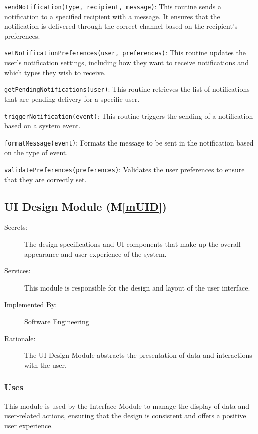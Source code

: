 \documentclass[12pt, titlepage]{article}
\newcommand{\mref}[1]{M\ref{#1}}
\begin{document}
\begin{description}
\begin{description}
  \item[Access Routine Semantics:]
  \item \texttt{sendNotification(type, recipient, message)}: This routine sends a notification to a 
  specified recipient with a message. It ensures that the notification is delivered through the correct 
  channel based on the recipient's preferences.
  \item \texttt{setNotificationPreferences(user, preferences)}: This routine updates the user's notification 
  settings, including how they want to receive notifications and which types they wish to receive.
  \item \texttt{getPendingNotifications(user)}: This routine retrieves the list of notifications that are 
  pending delivery for a specific user.
  \item \texttt{triggerNotification(event)}: This routine triggers the sending of a notification based on 
  a system event.
  \item 

  \item[Local Function:] 
  \item \texttt{formatMessage(event)}: Formats the message to be sent in the notification based on the 
  type of event.
  \item \texttt{validatePreferences(preferences)}: Validates the user preferences to ensure that they are 
  correctly set.
\end{description}

\subsection{UI Design Module (\mref{mUID})}
\begin{description}
  \item[Secrets:] The design specifications and UI components that make  up the
  overall appearance and user experience of the system.
  \item[Services:] This module is responsible for the design and layout of the
  user interface.
  \item[Implemented By:] Software Engineering
  \item[Rationale:] The UI Design Module abstracts the presentation of data and
  interactions with the user.
\end{description}

\subsubsection{Uses}
This module is used by the Interface Module to manage the display of data and
user-related actions, ensuring that the design is consistent and offers a
positive user experience.


\end{description}
\end{document}
